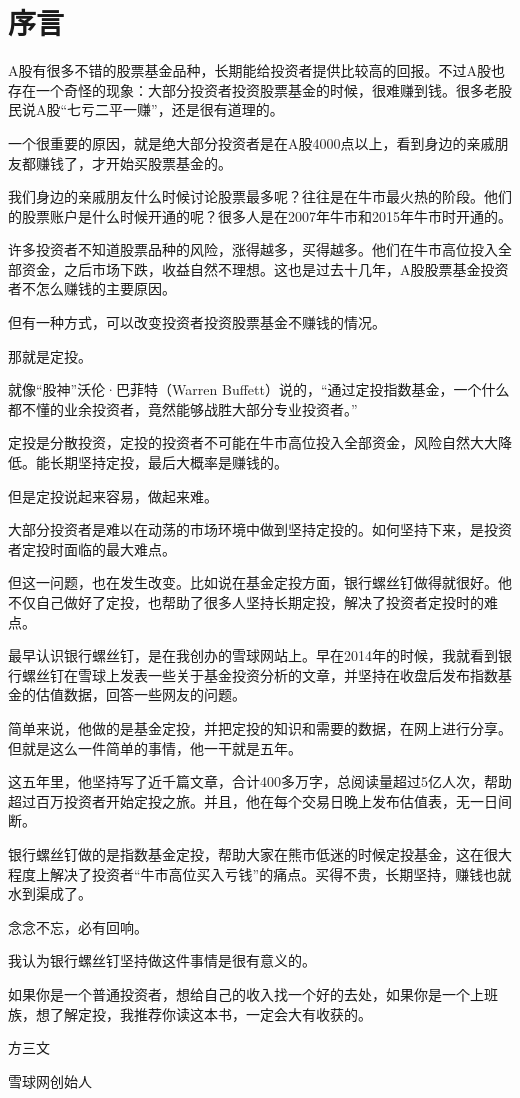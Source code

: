 \section*{序言}
A股有很多不错的股票基金品种，长期能给投资者提供比较高的回报。不过A股也存在一个奇怪的现象：大部分投资者投资股票基金的时候，很难赚到钱。很多老股民说A股“七亏二平一赚”，还是很有道理的。

一个很重要的原因，就是绝大部分投资者是在A股4000点以上，看到身边的亲戚朋友都赚钱了，才开始买股票基金的。

我们身边的亲戚朋友什么时候讨论股票最多呢？往往是在牛市最火热的阶段。他们的股票账户是什么时候开通的呢？很多人是在2007年牛市和2015年牛市时开通的。

许多投资者不知道股票品种的风险，涨得越多，买得越多。他们在牛市高位投入全部资金，之后市场下跌，收益自然不理想。这也是过去十几年，A股股票基金投资者不怎么赚钱的主要原因。

但有一种方式，可以改变投资者投资股票基金不赚钱的情况。

那就是定投。

就像“股神”沃伦·巴菲特（Warren Buffett）说的，“通过定投指数基金，一个什么都不懂的业余投资者，竟然能够战胜大部分专业投资者。”

定投是分散投资，定投的投资者不可能在牛市高位投入全部资金，风险自然大大降低。能长期坚持定投，最后大概率是赚钱的。

但是定投说起来容易，做起来难。

大部分投资者是难以在动荡的市场环境中做到坚持定投的。如何坚持下来，是投资者定投时面临的最大难点。

但这一问题，也在发生改变。比如说在基金定投方面，银行螺丝钉做得就很好。他不仅自己做好了定投，也帮助了很多人坚持长期定投，解决了投资者定投时的难点。

最早认识银行螺丝钉，是在我创办的雪球网站上。早在2014年的时候，我就看到银行螺丝钉在雪球上发表一些关于基金投资分析的文章，并坚持在收盘后发布指数基金的估值数据，回答一些网友的问题。

简单来说，他做的是基金定投，并把定投的知识和需要的数据，在网上进行分享。但就是这么一件简单的事情，他一干就是五年。

这五年里，他坚持写了近千篇文章，合计400多万字，总阅读量超过5亿人次，帮助超过百万投资者开始定投之旅。并且，他在每个交易日晚上发布估值表，无一日间断。

银行螺丝钉做的是指数基金定投，帮助大家在熊市低迷的时候定投基金，这在很大程度上解决了投资者“牛市高位买入亏钱”的痛点。买得不贵，长期坚持，赚钱也就水到渠成了。

念念不忘，必有回响。

我认为银行螺丝钉坚持做这件事情是很有意义的。

如果你是一个普通投资者，想给自己的收入找一个好的去处，如果你是一个上班族，想了解定投，我推荐你读这本书，一定会大有收获的。

\hfill {\kaishu 方三文}

\hfill {\kaishu 雪球网创始人}
